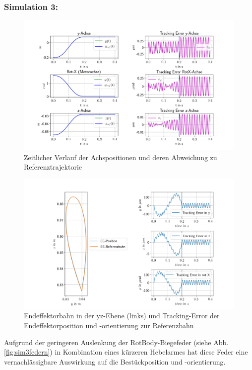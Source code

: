 \documentclass[10pt,a4paper]{iace.report}
\begin{document}
			 \subsubsection{\textcolor{blue!60!black}{Simulation 3:}}\leavevmode
				\begin{figure}[!h]
					\centering
					\includegraphics[width=0.99\linewidth]{./pics/posVerlaufAchsen_ZundTheta.png}
					\caption{Zeitlicher Verlauf der Achspositionen und deren Abweichung zu Referenztrajektorie}
					\label{fig:sim3pos}
				\end{figure}
				\begin{figure}[!h]
					\centering
					\includegraphics[width=0.99\linewidth]{./pics/endeffektor_ZundTheta.png}
					\caption{Endeffektorbahn in der yz-Ebene (links) und Tracking-Error der Endeffektorposition und -orientierung zur Referenzbahn}
					\label{fig:sim3ee}
				\end{figure}
				Aufgrund der geringeren Auslenkung der RotBody-Biegefeder (siehe Abb. \ref{fig:sim3federn}) in Kombination eines kürzeren Hebelarmes hat diese Feder eine vernachlässigbare Auswirkung auf die Bestückposition und -orientierung.
\end{document}

